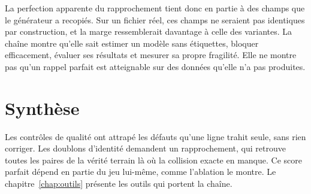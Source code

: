 La perfection apparente du rapprochement tient donc en partie à des champs que le générateur a
recopiés. Sur un fichier réel, ces champs ne seraient pas identiques par construction, et la marge
ressemblerait davantage à celle des variantes. La chaîne montre qu'elle sait estimer un modèle sans
étiquettes, bloquer efficacement, évaluer ses résultats et mesurer sa propre fragilité. Elle ne
montre pas qu'un rappel parfait est atteignable sur des données qu'elle n'a pas produites.

\section*{Synthèse}

Les contrôles de qualité ont attrapé les défauts qu'une ligne trahit seule, sans rien corriger. Les
doublons d'identité demandent un rapprochement, qui retrouve toutes les paires de la vérité terrain
là où la collision exacte en manque. Ce score parfait dépend en partie du jeu lui-même, comme
l'ablation le montre. Le chapitre~\ref{chap:outils} présente les outils qui portent la chaîne.
